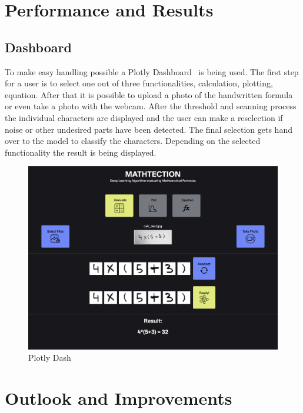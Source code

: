 \documentclass[@CLASSOPTIONS@]{tumarticle}
\begin{document}
\section{Performance and Results}
\label{sec:customization}

\subsection{Dashboard}



To make easy handling possible a Plotly Dashboard~\cite{plotly} is being used.
The first step for a user is to select one out of three functionalities,
calculation, plotting, equation.
After that it is possible to upload a photo of the handwritten formula or even take a photo
with the webcam.
After the threshold and scanning process the individual characters are displayed
and the user can make a reselection if noise or other undesired parts have been detected.
The final selection gets hand over to the model to classify the characters.
Depending on the selected functionality the result is being displayed.

\begin{figure}
    \begin{minipage}{0.48\textwidth}
     \centering
     \includegraphics[width=.9\linewidth]{figures/dash}
     \caption{Plotly Dash}\label{Fig:Dash}
   \end{minipage}
\end{figure}

\section{Outlook and Improvements}
\end{document}
